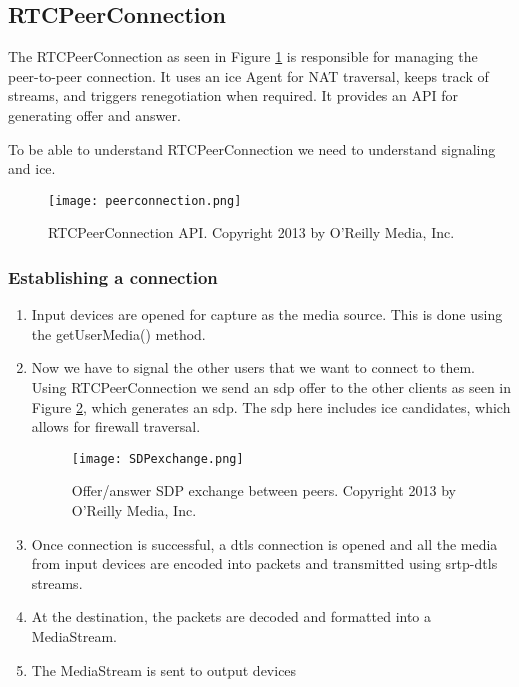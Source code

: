 \subsection{RTCPeerConnection}
The RTCPeerConnection as seen in Figure \ref{fig:rtcpeerconnection} is responsible for managing the peer-to-peer connection. It uses an \gls{ice} Agent for NAT traversal, keeps track of streams, and triggers renegotiation when required. It provides an API for generating offer and answer.

To be able to understand RTCPeerConnection we need to understand signaling and \gls{ice}.

\begin{figure}[here]
\centerline{\texttt{[image: peerconnection.png]}}
\caption{RTCPeerConnection API. Copyright 2013 by O'Reilly Media, Inc.}
\label{fig:rtcpeerconnection}
\end{figure}

\subsubsection{Establishing a connection}

\begin{enumerate}
\item Input devices are opened for capture as the media source. This is done using the getUserMedia() method.
\item Now we have to signal the other users that we want to connect to them. Using RTCPeerConnection we send an \gls{sdp} offer to the other clients as seen in Figure \ref{fig:sdp-exchange}, which generates an \gls{sdp}. The \gls{sdp} here includes \gls{ice} candidates,  which allows for firewall traversal.

\begin{figure}[here]
\centerline{\texttt{[image: SDPexchange.png]}}
\caption{Offer/answer SDP exchange between peers. Copyright 2013 by O'Reilly Media, Inc.}
\label{fig:sdp-exchange}
\end{figure}

\item Once connection is successful, a \gls{dtls} connection is opened and all the media from input devices are encoded into packets and transmitted using \gls{srtp}-\gls{dtls} streams.
\item At the destination, the packets are decoded and formatted into a MediaStream.
\item The MediaStream is sent to output devices
\end{enumerate}


